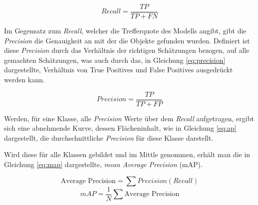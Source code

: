 \begin{equation}
  \label{eq:recall}
  Recall = \frac{TP}{TP + FN}
\end{equation}
\vspace{0.5cm}

Im Gegensatz zum \textit{Recall}, welcher die Trefferquote
des Modells angibt, gibt die \textit{Precision} die Genauigkeit
an mit der die Objekte gefunden wurden.
Definiert ist diese \textit{Precision} durch das 
Verhältnis der richtigen Schätzungen bezogen,
auf alle gemachten Schätzungen,
was auch durch das, in Gleichung \ref{eq:precision}
dargestellte, Verhältnis von True Positives und False Positives 
ausgedrückt werden kann.
\vspace{0.5cm}

\begin{equation}
  \label{eq:precision}
  Precision = \frac{TP}{TP + FP}
\end{equation}
\vspace{0.5cm}

Werden, für eine Klasse, alle \textit{Precision} 
Werte über dem \textit{Recall} aufgetragen, 
ergibt sich eine abnehmende Kurve, 
dessen Flächeninhalt, wie in Gleichung 
\ref{eq:ap} dargestellt, die durchschnittliche 
\textit{Precision} für diese Klasse darstellt.

Wird diese für alle Klassen gebildet und 
im Mittle genommen, erhält man die in 
Gleichung \ref{eq:map} dargestellte,
\textit{mean Average Precision} (mAP).

\vspace{0.5cm}
\begin{equation}
  \label{eq:ap}
  \text{Average Precision} = \sum Precision(Recall)
\end{equation}
\vspace{0.5cm}
\begin{equation}
  \label{eq:map}
  mAP = \frac{1}{N} \sum \text{Average Precision}
\end{equation}
\vspace{0.5cm}





